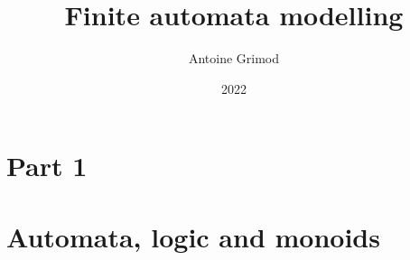 \documentclass[french]{report}
\author{Antoine Grimod}
\date{2022}
\title{Finite automata modelling }
\begin{document}
	\maketitle

	\chapter{Part 1}

	

	

	\chapter{Automata, logic and monoids}
	
\end{document}
